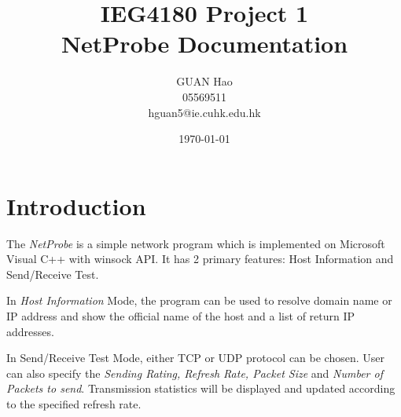 \documentclass[11pt]{article}
\title{IEG4180 Project 1\\NetProbe Documentation}
\author{GUAN Hao\\05569511\\hguan5@ie.cuhk.edu.hk}
\date{\today}
\begin{document}
\maketitle
\section{Introduction}
The {\em NetProbe} is a simple network program which is implemented on Microsoft Visual C++ with winsock API. It has 2 primary features: Host Information and Send/Receive Test.

In {\em Host Information} Mode, the program can be used to resolve domain name or IP address and show the official name of the host and a list of return IP addresses.

In Send/Receive Test Mode, either TCP or UDP protocol can be chosen. User can also specify the {\em Sending Rating, Refresh Rate, Packet Size} and {\em Number of Packets to send}. Transmission statistics will be displayed and updated according to the specified refresh rate.
\end{document}
